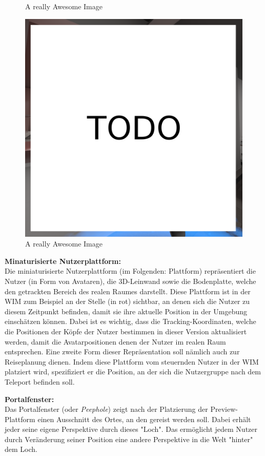 \begin{figure}[!htb]
  \caption{A really Awesome Image}\label{fig:awesome_image2}
\endminipage\hfill
{}%
  \includegraphics[width=\linewidth]{images/todo.png}
  \caption{A really Awesome Image}\label{fig:awesome_image3}
\endminipage

\end{figure}

\textbf{Minaturisierte Nutzerplattform:}\\
Die miniaturisierte Nutzerplattform (im Folgenden: Plattform) repräsentiert die Nutzer (in Form von Avataren), die 3D-Leinwand sowie die Bodenplatte, welche den getrackten Bereich des realen Raumes darstellt. Diese Plattform ist in der WIM zum Beispiel an der Stelle (in rot) sichtbar, an denen sich die Nutzer zu diesem Zeitpunkt befinden, damit sie ihre aktuelle Position in der Umgebung einschätzen können. Dabei ist es wichtig, dass die Tracking-Koordinaten, welche die Positionen der Köpfe der Nutzer bestimmen in dieser Version aktualisiert werden, damit die Avatarpositionen denen der Nutzer im realen Raum entsprechen. Eine zweite Form dieser Repräsentation soll nämlich auch zur Reiseplanung dienen. Indem diese Plattform vom steuernden Nutzer in der WIM platziert wird, spezifiziert er die Position, an der sich die Nutzergruppe nach dem Teleport befinden soll.

\textbf{Portalfenster:}\\
Das Portalfenster (oder \textit{Peephole}) zeigt nach der Platzierung der Preview-Plattform einen Ausschnitt des Ortes, an den gereist werden soll. Dabei erhält jeder seine eigene Perspektive durch dieses "Loch". Das ermöglicht jedem Nutzer durch Veränderung seiner Position eine andere Perspektive in die Welt "hinter" dem Loch.

